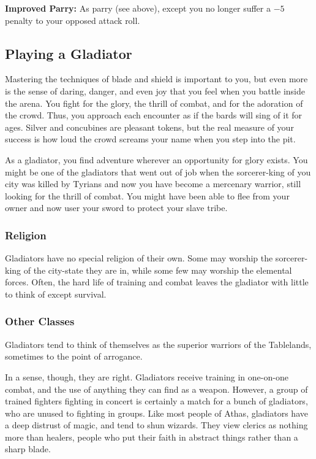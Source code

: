 \textbf{Improved Parry:} As parry (see above), except you no longer suffer a $-5$ penalty to your opposed attack roll.

\subsection{Playing a Gladiator}
Mastering the techniques of blade and shield is important to you, but even more is the sense of daring, danger, and even joy that you feel when you battle inside the arena. You fight for the glory, the thrill of combat, and for the adoration of the crowd. Thus, you approach each encounter as if the bards will sing of it for ages. Silver and concubines are pleasant tokens, but the real measure of your success is how loud the crowd screams your name when you step into the pit.

As a gladiator, you find adventure wherever an opportunity for glory exists. You might be one of the gladiators that went out of job when the sorcerer-king of you city was killed by Tyrians and now you have become a mercenary warrior, still looking for the thrill of combat. You might have been able to flee from your owner and now user your sword to protect your slave tribe.

\subsubsection{Religion}
Gladiators have no special religion of their own. Some may worship the sorcerer-king of the city-state they are in, while some few may worship the elemental forces. Often, the hard life of training and combat leaves the gladiator with little to think of except survival.

\subsubsection{Other Classes}
Gladiators tend to think of themselves as the superior warriors of the Tablelands, sometimes to the point of arrogance.

In a sense, though, they are right. Gladiators receive training in one-on-one combat, and the use of anything they can find as a weapon. However, a group of trained fighters fighting in concert is certainly a match for a bunch of gladiators, who are unused to fighting in groups. Like most people of Athas, gladiators have a deep distrust of magic, and tend to shun wizards. They view clerics as nothing more than healers, people who put their faith in abstract things rather than a sharp blade.

